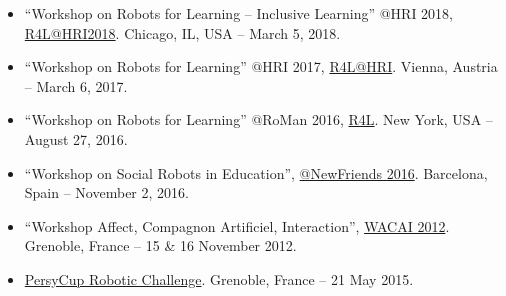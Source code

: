 \begin{itemize}
    \item ``Workshop on Robots for Learning -- Inclusive Learning'' @HRI 2018, \href{http://r4l.epfl.ch/HRI2018}{R4L@HRI2018}. Chicago, IL, USA -- March 5, 2018.
    \item ``Workshop on Robots for Learning'' @HRI 2017, \href{http://r4l.epfl.ch/HRI2017}{R4L@HRI}. Vienna, Austria -- March 6, 2017.
    \item ``Workshop on Robots for Learning'' @RoMan 2016, \href{http://r4l.epfl.ch/}{R4L}. New York, USA -- August 27, 2016.
    \item ``Workshop on Social Robots in Education'', \href{https://socialrobotsineducation.wordpress.com/}{@NewFriends 2016}. Barcelona, Spain -- November 2, 2016.
    \item ``Workshop Affect, Compagnon Artificiel, Interaction'', \href{http://wacai2012.imag.fr/}{WACAI 2012}. Grenoble, France -- 15 \& 16 November 2012.
    \item \href{http://persycup.imag.fr/}{PersyCup Robotic Challenge}. Grenoble, France -- 21 May 2015.
\end{itemize}

